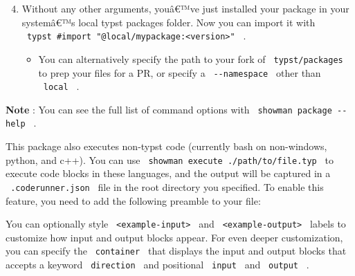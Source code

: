 \begin{enumerate}
\setcounter{enumi}{3}
\item
  Without any other arguments, youâ€™ve just installed your package in
  your systemâ€™s local typst packages folder. Now you can import it
  with
  \texttt{\ typst\ \#import\ "@local/mypackage:\textless{}version\textgreater{}"\ }
  .

  \begin{itemize}
  \tightlist
  \item
    You can alternatively specify the path to your fork of
    \texttt{\ typst/packages\ } to prep your files for a PR, or specify
    a \texttt{\ -\/-namespace\ } other than \texttt{\ local\ } .
  \end{itemize}
\end{enumerate}

\textbf{Note} : You can see the full list of command options with
\texttt{\ showman\ package\ -\/-help\ } .

This package also executes non-typst code (currently bash on
non-windows, python, and c++). You can use
\texttt{\ showman\ execute\ ./path/to/file.typ\ } to execute code blocks
in these languages, and the output will be captured in a
\texttt{\ .coderunner.json\ } file in the root directory you specified.
To enable this feature, you need to add the following preamble to your
file:

\begin{Shaded}
\begin{Highlighting}[]


\end{Highlighting}
\end{Shaded}

You can optionally style
\texttt{\ \textless{}example-input\textgreater{}\ } and
\texttt{\ \textless{}example-output\textgreater{}\ } labels to customize
how input and output blocks appear. For even deeper customization, you
can specify the \texttt{\ container\ } that displays the input and
output blocks that accepts a keyword \texttt{\ direction\ } and
positional \texttt{\ input\ } and \texttt{\ output\ } .

